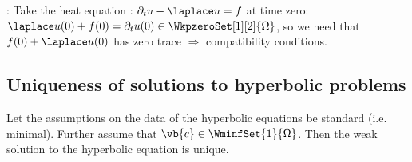 \begin{remark}:
	Take the heat equation :
	$\partial_t u -  \laplace u  = f$ at time zero: $\laplace u (0) + f(0) = \partial_t u(0) \in \WkpzeroSet[1][2]{\Omega}$, so we need that $f(0) + \laplace u (0)$ has zero trace $\Rightarrow$ compatibility conditions. 
\end{remark}

\subsection{Uniqueness of solutions to hyperbolic problems}
\label{sec:hyper_uniqueness}

\begin{theorem}
	Let the assumptions on the data of the hyperbolic equations be standard (i.e. minimal). Further assume that $\vb{c} \in \WminfSet{1}{\Omega}$. Then the weak solution to the hyperbolic equation is unique.
\end{theorem}

